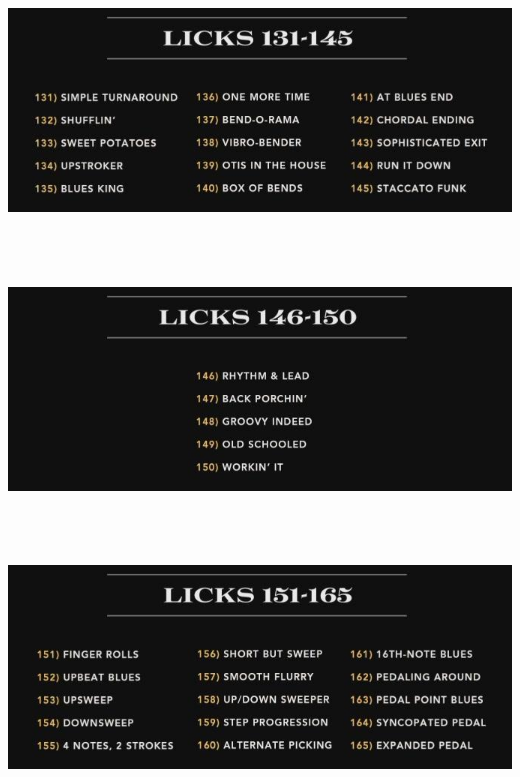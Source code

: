 \documentclass[a4paper]{book}
\begin{document}
\clearpage

\begin{center}
\includegraphics[width=17cm,height=6.881cm]{lebluessupportsmethodes-img25.jpg}
\end{center}


\begin{center}
\includegraphics[width=17cm,height=6.881cm]{lebluessupportsmethodes-img26.jpg}
\end{center}


\begin{center}
\includegraphics[width=17cm,height=6.881cm]{lebluessupportsmethodes-img27.jpg}
\end{center}
\end{document}
